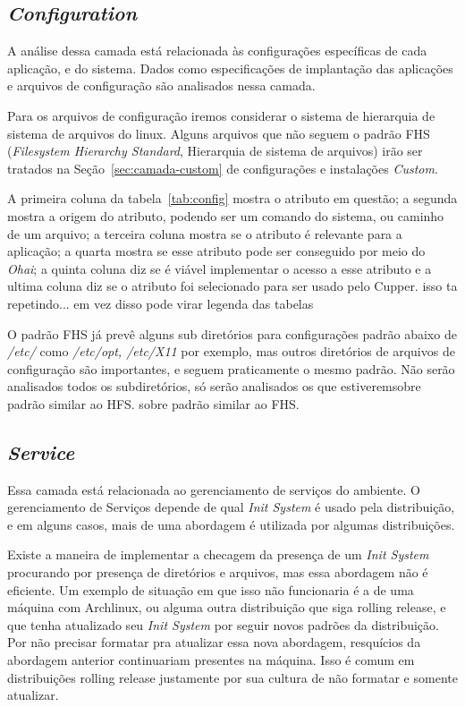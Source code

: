 \subsection{\textit{Configuration}}

A análise dessa camada está relacionada às configurações específicas de cada 
aplicação, e do sistema. Dados como especificações de implantação das
aplicações e arquivos de configuração são analisados nessa camada.

Para os arquivos de configuração iremos considerar  o sistema de hierarquia de
sistema de arquivos do linux. Alguns arquivos que não seguem o padrão FHS 
(\textit{Filesystem Hierarchy Standard}, Hierarquia de sistema de arquivos) irão
ser tratados na Seção~\ref{sec:camada-custom} de configurações e instalações \textit{Custom}.

A primeira coluna da tabela~\ref{tab:config} mostra o atributo em questão; a segunda mostra
a origem do atributo, podendo ser um comando do sistema, ou caminho de um arquivo;
a terceira coluna mostra se o atributo é relevante para a aplicação; a quarta mostra se
esse atributo pode ser conseguido por meio do \textit{Ohai}; a quinta coluna 
diz se é viável implementar o acesso a esse atributo e a ultima coluna
diz se o atributo foi selecionado para ser usado pelo Cupper. {\color{red} isso ta repetindo... em vez disso pode virar legenda das tabelas}



O padrão FHS já prevê alguns sub diretórios para configurações padrão abaixo de
\textit{/etc/} como \textit{/etc/opt, /etc/X11} por exemplo, mas outros diretórios
de arquivos de configuração são importantes, e seguem praticamente o mesmo padrão.
Não serão analisados todos os subdiretórios, só serão analisados os que estiveremsobre padrão similar ao HFS.
sobre padrão similar ao FHS.

\subsection{\textit{Service}}

Essa camada está relacionada ao gerenciamento de serviços do ambiente.
O gerenciamento de Serviços depende de qual \textit{Init System} é usado pela
distribuição, e em alguns casos, mais de uma abordagem é utilizada por algumas
distribuições.

Existe a maneira de implementar a checagem da presença de um \textit{Init System}
procurando por presença de diretórios e arquivos, mas essa abordagem não é
eficiente. Um exemplo de situação em que isso não funcionaria é a de uma máquina
com Archlinux, ou alguma outra distribuição que siga rolling release, e que 
tenha atualizado seu \textit{Init System} por seguir novos padrões da distribuição.
Por não precisar formatar pra atualizar essa nova abordagem, resquícios da abordagem
anterior continuariam presentes na máquina. Isso é comum em distribuições rolling
release justamente por sua cultura de não formatar e somente atualizar.

